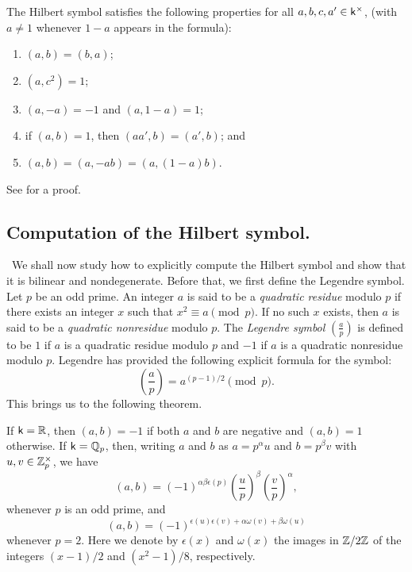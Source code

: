 \begin{theorem}
    The Hilbert symbol satisfies the following properties for all \(a, b, c, a' \in \mathsf{k}^{\times}\), (with \(a \neq 1\) whenever \(1-a\) appears in the formula):

    \smallskip

    \begin{enumerate}[nosep, label=(\alph*)]
        \item \((a, b) = (b, a)\);
        \item \((a, c^2) = 1\);
        \item \((a, -a) = -1\) and \((a, 1-a) = 1\);
        \item if \((a, b) = 1\), then \((aa', b) = (a', b)\); and
        \item \((a, b) = (a, -ab) = (a, (1-a)b)\).\label{item:formula-e}
    \end{enumerate}
\end{theorem}

See \cite[pp.~19--21]{serre2012course} for a proof.

\subsection{Computation of the Hilbert symbol.}~We shall now study how to explicitly compute the Hilbert symbol and show that it is bilinear and nondegenerate. Before that, we first define the {Legendre symbol}. Let \(p\) be an odd prime. An integer \(a\) is said to be a \emph{quadratic residue} modulo \(p\) if there exists an integer \(x\) such that \(x^2 \equiv a \pmod{p}\). If no such \(x\) exists, then \(a\) is said to be a \emph{quadratic nonresidue} modulo \(p\). The \emph{Legendre symbol} \(\left(\frac{a}{p}\right)\) is defined to be \(1\) if \(a\) is a quadratic residue modulo \(p\) and \(-1\) if \(a\) is a quadratic nonresidue modulo \(p\). Legendre has provided the following explicit formula for the symbol:\label{sec:computing-hilbert-symbol}
\[
       \left(\frac{a}{p}\right) = a^{(p-1)/2} \pmod{p}.  
\]
This brings us to the following theorem.
\begin{theorem}
    {\normalfont\cite[pp.~20--21]{serre2012course}}
    If \(\mathsf{k} = \mathbb{R}\), then \((a, b) = -1\) if both \(a\) and \(b\) are negative and \((a, b) = 1\) otherwise. If \(\mathsf{k} = \mathbb{Q}_p\), then, writing \(a\) and \(b\) as \(a = p^\alpha u\) and \(b = p^\beta v\) with \(u, v \in \mathbb{Z}_p^{\times}\), we have
    \[
        (a, b) = (-1)^{\alpha\beta\epsilon(p)}\left(\frac{u}{p}\right)^{\beta}\left(\frac{v}{p}\right)^{\alpha},
    \]
    whenever \(p\) is an odd prime, and 
    \[
        (a, b) = (-1)^{\epsilon(u)\epsilon(v) + \alpha\omega(v) + \beta\omega(u)}
    \]
    whenever \(p = 2\). Here we denote by \(\epsilon(x)\) and \(\omega(x)\) the images in \(\mathbb{Z}/2\mathbb{Z}\) of the integers \((x-1)/2\) and \((x^2-1)/8\), respectively.
\end{theorem}

